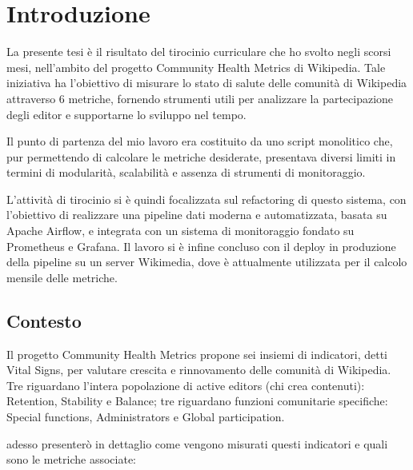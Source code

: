 \chapter{Introduzione}
\label{cha:intro}


La presente tesi è il risultato del tirocinio curriculare che ho svolto negli scorsi mesi, nell'ambito del progetto Community Health Metrics di Wikipedia.
Tale iniziativa ha l’obiettivo di misurare lo stato di salute delle comunità di Wikipedia attraverso 6 metriche,
fornendo strumenti utili per analizzare la partecipazione degli editor e supportarne lo sviluppo nel tempo.

Il punto di partenza del mio lavoro era costituito da uno script monolitico che,
pur permettendo di calcolare le metriche desiderate, presentava diversi limiti in termini di modularità,
scalabilità e assenza di strumenti di monitoraggio.

L’attività di tirocinio si è quindi focalizzata sul refactoring di questo sistema,
con l’obiettivo di realizzare una pipeline dati moderna e automatizzata, basata su Apache Airflow, e integrata con un sistema di monitoraggio fondato su Prometheus e Grafana.
Il lavoro si è infine concluso con il deploy in produzione della pipeline su un server Wikimedia,
dove è attualmente utilizzata per il calcolo mensile delle metriche.

\section{Contesto}
\label{sec:contesto}
Il progetto Community Health Metrics propone sei insiemi di indicatori, detti Vital Signs, per valutare crescita e rinnovamento delle comunità di Wikipedia.
Tre riguardano l’intera popolazione di active editors (chi crea contenuti):
Retention, Stability e Balance;
tre riguardano funzioni comunitarie specifiche: Special functions, Administrators e Global participation.

adesso presenterò in dettaglio come vengono misurati questi indicatori e quali sono le metriche associate:

